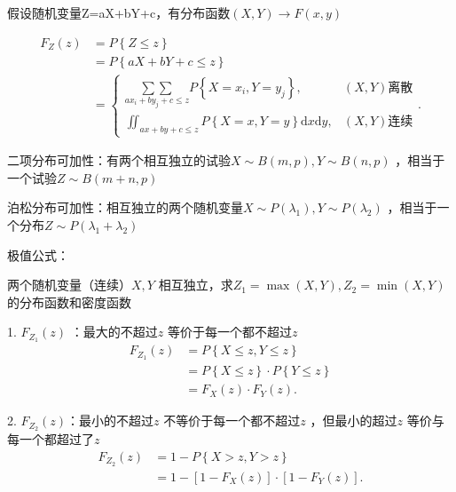 假设随机变量Z=aX+bY+c，有分布函数$\left( X,Y \right) \to F\left( x,y \right) $

\begin{align*} 
    F_Z\left( z \right) &=P\left\{ Z\le z \right\} \\
                        &= P\left\{ aX+bY+c\le z \right\}  \\
                        &= \begin{cases}
                            {\underset{ax_{i}+by_{j}+c\le z}{\sum{\sum}}} P\left\{ X=x_{i},Y=y_{j} \right\} ,&\left( X,Y \right) \text{离散}\\
                            {\iint_{ax+by+c\le z}}P\left\{ X=x,Y=y \right\} \mathrm{d}x\mathrm{d}y,&\left( X,Y \right) \text{连续}
                        \end{cases} 
.\end{align*}
\begin{notation}
    二项分布可加性：有两个相互独立的试验$X\sim B\left( m,p \right) ,Y\sim B\left( n,p \right) $ ，相当于一个试验$Z\sim B\left( m+n,p \right) $ 

    泊松分布可加性：相互独立的两个随机变量$X\sim P\left( \lambda_1 \right) ,Y\sim P\left( \lambda_2 \right) $ ，相当于一个分布$Z\sim P\left( \lambda_1+\lambda_2 \right) $
\end{notation}
\begin{notation}
    极值公式：

    两个随机变量（连续）$X,Y$ 相互独立，求$Z_1=\max\left( X,Y \right) ,Z_2=\min\left( X,Y \right) $的分布函数和密度函数

    1. $F_{Z_1}\left( z \right) $ ：最大的不超过$z$ 等价于每一个都不超过$z$ 
    \begin{align*}
        F_{Z_1}\left( z \right) &= P\left\{ X\le z,Y\le z \right\} \\
                                &= P\left\{ X\le z \right\} \cdot P\left\{ Y\le z \right\}  \\
                                &=F_X\left( z \right) \cdot F_Y\left( z \right) 
    .\end{align*}

    2. $F_{Z_2}\left( z \right) $：最小的不超过$z$ 不等价于每一个都不超过$z$ ，但最小的超过$z$ 等价与每一个都超过了$z$ 
    \begin{align*}
        F_{Z_2}\left( z \right) &= 1-P\left\{ X>z,Y>z \right\}  \\
                                &= 1-[1-F_X\left( z \right) ]\cdot [1-F_Y\left( z \right) ] 
    .\end{align*}
\end{notation}
